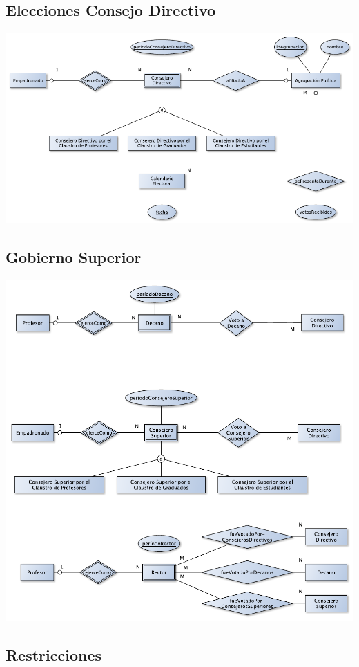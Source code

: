 \documentclass[a4paper, 10pt, twoside]{article}
\begin{document}
\subsection{Elecciones Consejo Directivo}
\includegraphics{../diagramas/eleccionesCD.pdf}

\subsection{Gobierno Superior}
\includegraphics{../diagramas/gobiernoSuperior.pdf}


\subsection{Restricciones}
\end{document}
